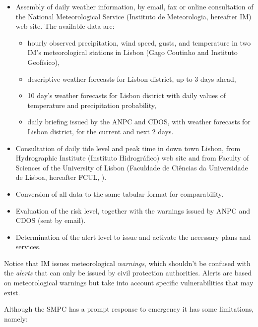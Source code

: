 \begin{itemize}
    \item Assembly of daily weather information, by email, fax or online consultation of the National Meteorological Service (Instituto de Meteorologia, hereafter IM) web site. The available data are: 

    \begin{itemize}
        \item hourly observed precipitation, wind speed, gusts, and temperature in two IM’s meteorological stations in Lisbon (Gago Coutinho and Instituto Geofísico), 
        \item descriptive weather forecasts for Lisbon district, up to 3 days ahead, 
        \item 10 day's weather forecasts for Lisbon district with daily values of temperature and precipitation probability, 
        \item daily briefing issued by the ANPC and CDOS, with weather forecasts for Lisbon district, for the current and next 2 days.
    \end{itemize}

    \item Consultation of daily tide level and peak time in down town Lisbon, from Hydrographic Institute (Instituto Hidrográfico) web site and from Faculty of Sciences of the University of Lisbon (Faculdade de Ciências da Universidade de Lisboa, hereafter FCUL, \cite{Antunes2007}).
    \item Conversion of all data to the same tabular format for comparability.
    \item Evaluation of the risk level, together with the warnings issued by ANPC and CDOS (sent by email). 
    \item Determination of the alert level to issue and activate the necessary plans and services. 
\end{itemize}

Notice that IM issues meteorological \textit{warnings}, which shouldn't be confused with the \textit{alerts} that can only be issued by civil protection authorities. Alerts are based on meteorological warnings but take into account specific vulnerabilities that may exist. 

Although the SMPC has a prompt response to emergency it has some limitations, namely:

